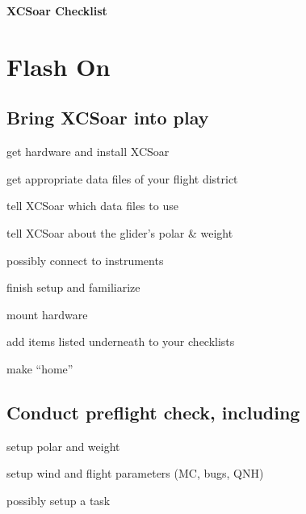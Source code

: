 \documentclass[english,a4paper,12pt]{refrep}
\begin{document}
\newpage
\begin{center}
{\Huge\textbf{XCSoar Checklist}}
\end{center}
\section*{Flash \textcolor{flashyellow}{On}}\label{ch:flashon}

\subsection{\textcolor{flashblue}{Bring XCSoar into play}}
\begin{compactitem}
\item get hardware and install XCSoar
\item get appropriate data files of your flight district
\item tell XCSoar which data files to use
\item tell XCSoar about the glider's polar \& weight
\item possibly connect to instruments
\item finish setup and familiarize
\item mount hardware
\item add items listed underneath to your checklists
\item make ``home''
\end{compactitem}

\subsection*{\textcolor{flashblue}{Conduct preflight check, including}}
\begin{compactitem}
\item setup polar and weight
\item setup wind and flight parameters (MC, bugs, QNH)
\item possibly setup a task
\end{compactitem}
\end{document}
